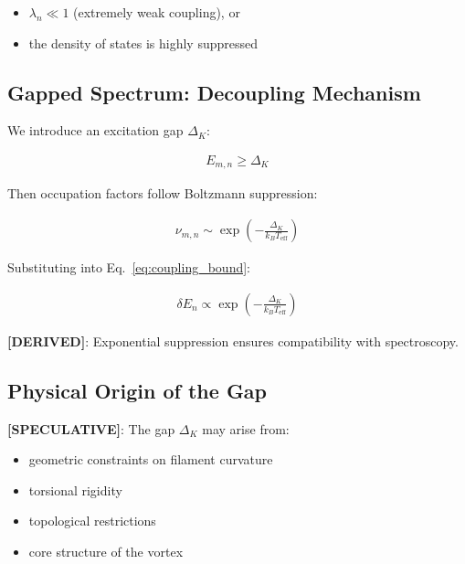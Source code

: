 \documentclass[11pt]{article}
\theoremstyle{definition}
\theoremstyle{plain}
\theoremstyle{remark}
\begin{document}
        \begin{itemize}
            \item $\lambda_n \ll 1$ (extremely weak coupling), or
            \item the density of states is highly suppressed
        \end{itemize}
    
    \subsection{Gapped Spectrum: Decoupling Mechanism}
        
        We introduce an excitation gap $\Delta_K$:
        
        \begin{align}
            E_{m,n} \geq \Delta_K
        \end{align}
        
        Then occupation factors follow Boltzmann suppression:
        
        \begin{align}
            \nu_{m,n} \sim \exp\left(-\frac{\Delta_K}{k_B T_{\text{eff}}}\right)
        \end{align}
        
        Substituting into Eq.~\ref{eq:coupling_bound}:
        
        \begin{align}
            \delta E_n \propto \exp\left(-\frac{\Delta_K}{k_B T_{\text{eff}}}\right)
            \label{eq:boltzmann_suppression}
        \end{align}
        
        \textbf{[DERIVED]}:
        Exponential suppression ensures compatibility with spectroscopy.
    
    \subsection{Physical Origin of the Gap}
        
        \textbf{[SPECULATIVE]}:
        The gap $\Delta_K$ may arise from:
        
        \begin{itemize}
            \item geometric constraints on filament curvature
            \item torsional rigidity
            \item topological restrictions
            \item core structure of the vortex
        \end{itemize}
    
\end{document}
